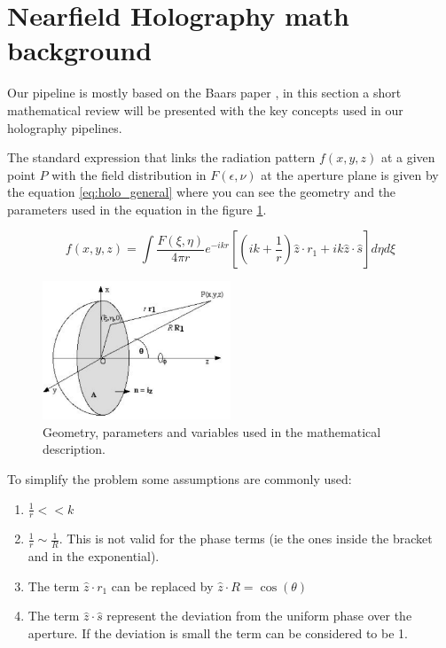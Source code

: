\section{Nearfield Holography math background}

Our pipeline is mostly based on the Baars paper \cite{baars}, in this section a short mathematical review will be presented with the key concepts used in our holography pipelines.


The standard expression that links the radiation pattern $f(x,y,z)$ at a given point $P$ with the field distribution in $F(\epsilon, \nu)$ at the aperture plane is given by the equation \ref{eq:holo_general} where you can see the geometry and the parameters used in the equation in the figure \ref{fig:antenna_holo}.


\begin{equation}
    f(x,y,z) = \int \frac{F(\xi,\eta)}{4\pi r} e^{-ikr} \left[ \left(ik+\frac{1}{r} \right) \hat{z}\cdot r_1 + ik\hat{z}\cdot\hat{s} \right] d\eta d\xi 
    \label{eq:holo_general}
\end{equation}


\begin{figure}
    \centering
    \includegraphics[width=0.5\textwidth]{images/antenna_holo.png}
    \caption{Geometry, parameters and variables used in the mathematical description.}
    \label{fig:antenna_holo}
\end{figure}


To simplify the problem some assumptions are commonly used:
\begin{enumerate}
    \item $\frac{1}{r} << k$
    \item $\frac{1}{r} \sim \frac{1}{R}$. This is not valid for the phase terms (ie the ones inside the bracket and in the exponential).
    \item  The term $\hat{z}\cdot r_1$ can be replaced by $\hat{z}\cdot R = \cos(\theta)$
    \item The term $\hat{z}\cdot \hat{s}$ represent the deviation from the uniform phase over the aperture. If the deviation is small the term can be considered to be 1.
\end{enumerate}

